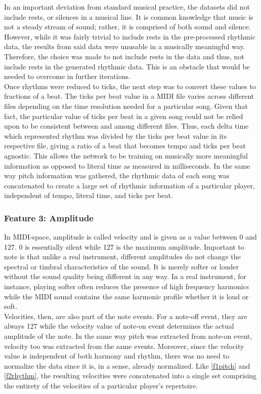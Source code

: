 \documentclass[conference]{IEEEtran}
\begin{document}
In an important deviation from standard musical practice, the datasets did not include rests, or silences in a musical line. It is common knowledge that music is not a steady stream of sound; rather, it is comprised of both sound and silence. However, while it was fairly trivial to include rests in the pre-processed rhythmic data, the results from said data were unusable in a musically meaningful way. Therefore, the choice was made to not include rests in the data and thus, not include rests in the generated rhythmic data. This is an obstacle that would be needed to overcome in further iterations.\\

Once rhythms were reduced to ticks, the next step was to convert these values to fractions of a beat. The ticks per beat value in a MIDI file varies across different files depending on the time resolution needed for a particular song. Given that fact, the particular value of ticks per beat in a given song could not be relied upon to be consistent between and among different files. Thus, each delta time which represented rhythm was divided by the ticks per beat value in its respective file, giving a ratio of a beat that becomes tempo and ticks per beat agnostic. This allows the network to be training on musically more meaningful information as opposed to literal time as measured in milliseconds. In the same way pitch information was gathered, the rhythmic data of each song was concatenated to create a large set of rhythmic information of a particular player, independent of tempo, literal time, and ticks per beat.\\

\subsubsection{Feature 3: Amplitude} \label{f3amplitude}
In MIDI-space, amplitude is called velocity and is given as a value between 0 and 127. 0 is essentially silent while 127 is the maximum amplitude. Important to note is that unlike a real instrument, different amplitudes do not change the spectral or timbral characteristics of the sound. It is merely softer or louder without the sound quality being different in any way. In a real instrument, for instance, playing softer often reduces the presence of high frequency harmonics while the MIDI sound contains the same harmonic profile whether it is loud or soft.\\

Velocities, then, are also part of the note events. For a note-off event, they are always 127 while the velocity value of note-on event determines the actual amplitude of the note. In the same way pitch was extracted from note-on event, velocity too was extracted from the same events. Moreover, since the velocity value is independent of both harmony and rhythm, there was no need to normalize the data since it is, in a sense, already normalized. Like \ref{f1pitch} and \ref{f2rhythm}, the resulting velocities were concatenated into a single set comprising the entirety of the velocities of a particular player's repertoire.
\end{document}
